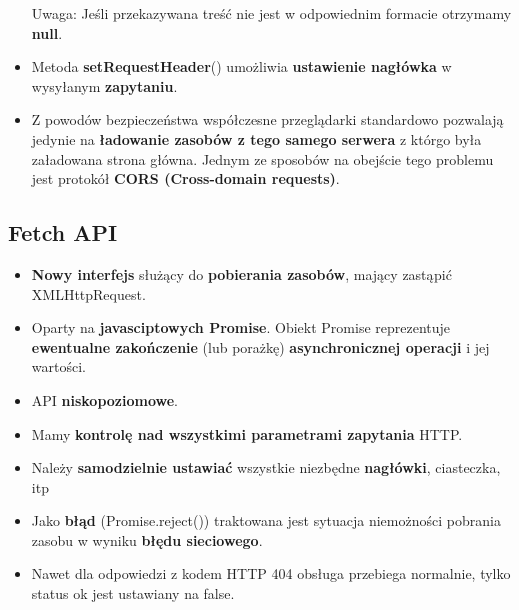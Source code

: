 \documentclass[../main.tex]{subfiles}
\begin{document}
\begin{itemize}
\begin{table}[H]
\begin{center}
            \end{center}
        \end{table}
        Uwaga: Jeśli przekazywana treść nie jest w odpowiednim formacie otrzymamy
        \textbf{null}.
        \item Metoda \textbf{setRequestHeader}() umożliwia \textbf{ustawienie nagłówka} w wysyłanym \textbf{zapytaniu}.
        \item Z powodów bezpieczeństwa współczesne przeglądarki standardowo
        pozwalają jedynie na \textbf{ładowanie zasobów z tego samego serwera} z którgo była
        załadowana strona główna. Jednym ze sposobów na obejście tego problemu
        jest protokół \textbf{CORS (Cross-domain requests)}.
    \end{itemize}

    \subsection{Fetch API}
    \begin{itemize}
        \item \textbf{Nowy interfejs} służący do \textbf{pobierania zasobów}, mający zastąpić XMLHttpRequest.
        \item Oparty na \textbf{javasciptowych Promise}. Obiekt Promise reprezentuje \textbf{ewentualne zakończenie} (lub porażkę) \textbf{asynchronicznej operacji} i jej wartości.
        \item API \textbf{niskopoziomowe}.
        \item Mamy \textbf{kontrolę nad wszystkimi parametrami zapytania} HTTP.
        \item Należy \textbf{samodzielnie ustawiać} wszystkie niezbędne \textbf{nagłówki}, ciasteczka, itp
        \item Jako \textbf{błąd} (Promise.reject()) traktowana jest sytuacja niemożności pobrania
        zasobu w wyniku \textbf{błędu sieciowego}.
        \item Nawet dla odpowiedzi z kodem HTTP 404 obsługa przebiega normalnie, tylko
        status ok jest ustawiany na false.
    \end{itemize}
\end{document}
